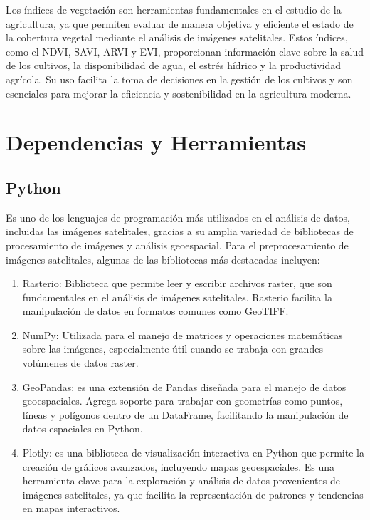	Los índices de vegetación son herramientas fundamentales en el estudio de la agricultura, ya que permiten
 	evaluar de manera objetiva y eficiente el estado de la cobertura vegetal mediante el análisis de imágenes
  	satelitales. Estos índices, como el NDVI, SAVI, ARVI y EVI, proporcionan información clave sobre la salud de
	los cultivos, la disponibilidad de agua, el estrés hídrico y la productividad agrícola. Su uso facilita 
	la toma de decisiones en la gestión de los cultivos y son esenciales para mejorar la eficiencia y 
	sostenibilidad en la agricultura moderna.

\section{Dependencias y Herramientas}

\subsection{Python}
Es uno de los lenguajes de programación más utilizados en el análisis de datos, incluidas las 
imágenes satelitales, gracias a su amplia variedad de bibliotecas de procesamiento de imágenes y análisis
geoespacial. Para el preprocesamiento de imágenes satelitales, algunas de las bibliotecas más destacadas 
incluyen:

\begin{enumerate}
	\item Rasterio: Biblioteca que permite leer y escribir archivos raster, que son fundamentales en el 
	análisis de imágenes satelitales. Rasterio facilita la manipulación de datos en formatos comunes como
	GeoTIFF.
	\item NumPy: Utilizada para el manejo de matrices y operaciones matemáticas sobre las imágenes, especialmente
	útil cuando se trabaja con grandes volúmenes de datos raster.  
	\item GeoPandas: es una extensión de Pandas diseñada para el manejo de datos geoespaciales. Agrega soporte 
	para trabajar con geometrías como puntos, líneas y polígonos dentro de un DataFrame, facilitando la
	manipulación de datos espaciales en Python.
	\item Plotly: es una biblioteca de visualización interactiva en Python que permite la creación de gráficos
	 avanzados, incluyendo mapas geoespaciales. Es una herramienta clave para la exploración y análisis de 
	 datos provenientes de imágenes satelitales, ya que facilita la representación de patrones y
	tendencias en mapas interactivos.
	\end{enumerate}

